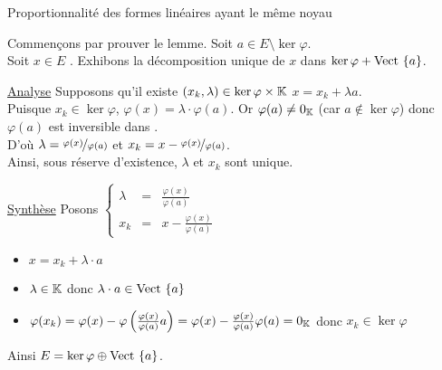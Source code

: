 \documentclass{article}
\begin{document}
	\begin{question_kholle}
		[\textit{Lemme fondamental dans l'étude des formes linéaires} \ \
		Soit $\varphi \in E^* \setminus \{0_{E^*}\}$. \\
		Tout vecteur de $E$ n'appartenant pas au noyau de $\varphi$ engendre une droite qui est supplémentaire au noyau de $\varphi$ dans $E$.
		\begin{equation}
			\forall a \in E \setminus \ker \varphi,
			E = \ker \varphi \oplus \Vect{\{a\}}
		\end{equation}
		
		Deux formes linéaires non nulles $\varphi$ et $\psi$ ont le même noyau si est seulement si elles sont proportionnelles ce qui revient à dire que la famille $\left(\varphi,\psi\right)$ est liée.
		\begin{equation}
			\forall \left(\varphi,\psi\right) \in \left( E^* \setminus \{0_{E^*}\} \right) ^2,
			\ker \varphi = \ker \psi \iff \exists \lambda \in \K^* : \varphi = \lambda \cdot \psi
		\end{equation}]
		{Proportionnalité des formes linéaires ayant le même noyau}
		
		Commençons par prouver le lemme.
		Soit $a \in E \setminus \ker \varphi$. \\
		Soit $x \in E$ \fq.
		Exhibons la décomposition unique de $x$ dans $\ker \varphi + \text{Vect }{\{a\}}$.
		
		\underline{Analyse} Supposons qu'il existe $(x_k, \lambda) \in \ker \varphi \times \mathbb K$ \tq $x = x_k + \lambda a$. \\
		Puisque $x_k \in \ker \varphi$, $\varphi(x) = \lambda \cdot \varphi(a)$. Or $\varphi(a) \neq 0_{\mathbb K}$ (car $a \notin \ker \varphi$) donc $\varphi(a)$ est inversible dans \K. \\
		D'où $\lambda = \nicefrac{\varphi(x)}{\varphi(a)}$ et $x_k = x - \nicefrac{\varphi(x)}{\varphi(a)}$. \\
		Ainsi, sous réserve d'existence, $\lambda$ et $x_k$ sont unique.
		
		\underline{Synthèse} Posons $\displaystyle \left\{ \begin{matrix}
			\lambda &=& \frac{\varphi(x)}{\varphi(a)} \\
			x_k &=& x - \frac{\varphi(x)}{\varphi(a)}
		\end{matrix} \right.$
		\begin{itemize}[label=$*$]
			\item $x = x_k + \lambda \cdot a$
			\item $\lambda \in \mathbb K$ donc $\lambda \cdot a \in \text{Vect }{\{a\}}$
			\item $\varphi(x_k) = \varphi(x) - \varphi\left( \frac{\varphi(x)}{\varphi(a)} a \right) = \varphi(x) - \frac{\varphi(x)}{\varphi(a)} \varphi(a) = 0_{\mathbb K}$ donc $x_k \in \ker \varphi$
		\end{itemize}
		Ainsi $E = \ker \varphi \oplus \text{Vect }{\{a\}}$.
		\newline \newline
		

\end{question_kholle}
\end{document}
